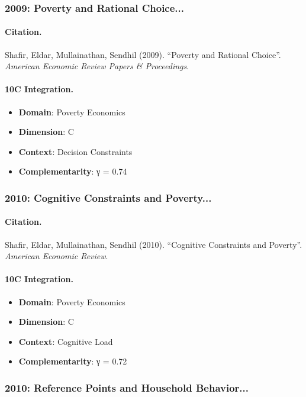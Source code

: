 \subsubsection{2009: Poverty and Rational Choice...}

\paragraph{Citation.}
Shafir, Eldar, Mullainathan, Sendhil (2009). ``Poverty and Rational Choice''. \textit{American Economic Review Papers & Proceedings}.

\paragraph{10C Integration.}
\begin{itemize}[nosep]
  \item \textbf{Domain}: Poverty Economics
  \item \textbf{Dimension}: C
  \item \textbf{Context}: Decision Constraints
  \item \textbf{Complementarity}: γ = 0.74
\end{itemize}


\subsubsection{2010: Cognitive Constraints and Poverty...}

\paragraph{Citation.}
Shafir, Eldar, Mullainathan, Sendhil (2010). ``Cognitive Constraints and Poverty''. \textit{American Economic Review}.

\paragraph{10C Integration.}
\begin{itemize}[nosep]
  \item \textbf{Domain}: Poverty Economics
  \item \textbf{Dimension}: C
  \item \textbf{Context}: Cognitive Load
  \item \textbf{Complementarity}: γ = 0.72
\end{itemize}


\subsubsection{2010: Reference Points and Household Behavior...}

